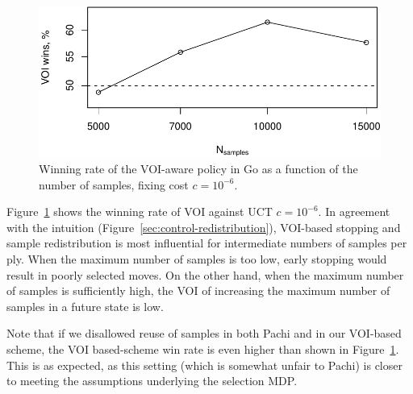 \documentclass[]{article}
\newcommand{\figref}[1]{Figure~\ref{#1}}
\begin{document}
\begin{figure}[h!]
\centering
\includegraphics[scale=0.6]{voi-wins.pdf}
\caption{Winning rate of the VOI-aware policy in Go as a function of the number of samples, fixing cost $c=10^{-6}$.}
\label{fig:voi-wins}
\end{figure}

\figref{fig:voi-wins}
shows the winning rate of VOI against UCT $c=10^{-6}$. In agreement with the intuition
(\figref{sec:control-redistribution}), VOI-based stopping and
sample redistribution is most influential for intermediate numbers of
samples per ply. When the maximum number of samples is too low, early
stopping would result in poorly selected moves. On the other hand,
when the maximum number of samples is sufficiently high, the VOI of
increasing the maximum number of samples in a future state is low.

Note that if we disallowed reuse of samples in both Pachi and
in our VOI-based scheme, the VOI based-scheme
win rate is even higher than shown in \figref{fig:voi-wins}. This is as expected,
as this setting (which is somewhat unfair to Pachi) is closer to
meeting the assumptions underlying the selection MDP.










\end{document}
